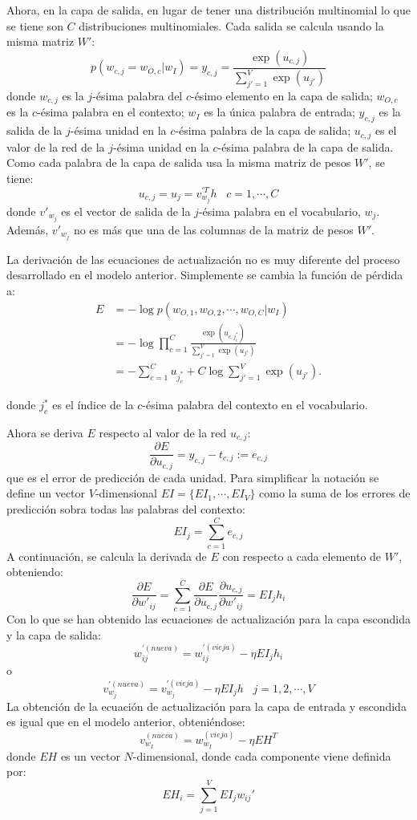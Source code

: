 Ahora, en la capa de salida, en lugar de tener una distribución multinomial lo que se tiene son $C$ distribuciones
multinomiales. Cada salida se calcula usando la misma matriz $W'$:
\[
  p\left( w_{c,j} = w_{O,c} | w_I \right) = y_{c,j} = \frac{\exp(u_{c,j})}{\sum_{j'=1}^V\exp(u_{j'})}
\]
donde $w_{c,j}$ es la $j$-ésima palabra del $c$-ésimo elemento en la capa de salida; $w_{O,c}$ es la $c$-ésima
palabra en el contexto; $w_I$ es la única palabra de entrada; $y_{c,j}$ es la salida de la $j$-ésima unidad en la $c$-ésima
palabra de la capa de salida; $u_{c,j}$ es el valor de la red de la $j$-ésima unidad en la $c$-ésima palabra de la capa de salida.
Como cada palabra de la capa de salida usa la misma matriz de pesos $W'$, se tiene:
\[
  u_{c,j} = u_j = v^{'T}_{w_j}h \;\;\; c=1,\cdots, C
\]
donde $v'_{w_j}$ es el vector de salida de la $j$-ésima palabra en el vocabulario, $w_j$. Además, $v'_{w_j}$ no es más que una de las
columnas de la matriz de pesos $W'$.

La derivación de las ecuaciones de actualización no es muy diferente del proceso desarrollado en el modelo anterior. Simplemente se cambia la función de pérdida a:
\begin{align}\label{perdida_1}
  E & = - \log p\left( w_{O,1}, w_{O,2}, \cdots, w_{O,C} | w_I \right) \\
    & = - \log \prod_{c=1}^C \frac{\exp(u_{c,j_c^*})}{\sum_{j'=1}^V\exp(u_{j'})} \\
    & = - \sum_{c=1}^C u_{j^*_c} + C\log \sum_{j'=1}^V\exp(u_{j'}).
  \end{align}

donde $j_c^*$ es el índice de la $c$-ésima palabra del contexto en el vocabulario.

Ahora se deriva $E$ respecto al valor de la red $u_{c,j}$:
\[
  \frac{\partial E}{\partial u_{c,j}} = y_{c,j} - t_{c,j} := e_{c,j}
\]
que es el error de predicción de cada unidad. Para simplificar la notación se define un vector $V$-dimensional $EI=\{EI_1, \cdots, EI_V\}$ como la suma de los errores de
predicción sobra todas las palabras del contexto:
\[
  EI_j = \sum_{c=1}^C e_{c,j}
\]
A continuación, se calcula la derivada de $E$ con respecto a cada elemento de $W'$, obteniendo:
\[
  \frac{\partial E}{\partial w'_{ij}} = \sum_{c=1}^C \frac{\partial E}{\partial u_{c,j}} \frac{\partial u_{c,j}}{\partial w'_{ij}} = EI_j h_i
\]
Con lo que se han obtenido las ecuaciones de actualización para la capa escondida y la capa de salida:
\[
w_{ij}^{'(nueva)} = w_{ij}^{'(vieja)} - \eta EI_j h_i
\]
o
\[
  v_{w_{j}}^{'(nueva)}= v_{w_j}^{'(vieja)} - \eta EI_j h \;\;\; j = 1,2, \cdots, V
\]
La obtención de la ecuación de actualización para la capa de entrada y escondida es igual que en el modelo anterior, obteniéndose:
\[
  v_{w_I}^{(nueva)} = w_{w_I}^{(vieja)} - \eta EH^T
\]
donde $EH$ es un vector $N$-dimensional, donde cada componente viene definida por:
\[
  EH_i = \sum_{j=1}^V EI_j w_{ij}'
\]

